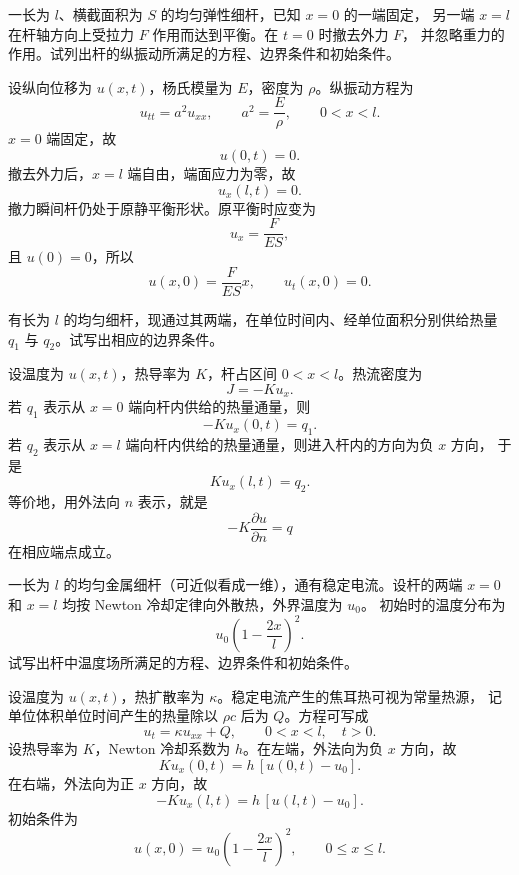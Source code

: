 ﻿


\begin{question}
一长为 \(l\)、横截面积为 \(S\) 的均匀弹性细杆，已知 \(x=0\) 的一端固定，
另一端 \(x=l\) 在杆轴方向上受拉力 \(F\) 作用而达到平衡。在 \(t=0\) 时撤去外力 \(F\)，
并忽略重力的作用。试列出杆的纵振动所满足的方程、边界条件和初始条件。

\begin{solution}
设纵向位移为 \(u(x,t)\)，杨氏模量为 \(E\)，密度为 \(\rho\)。纵振动方程为
\[
u_{tt}=a^2u_{xx},\qquad a^2=\frac{E}{\rho},\qquad 0<x<l.
\]
\(x=0\) 端固定，故
\[
u(0,t)=0.
\]
撤去外力后，\(x=l\) 端自由，端面应力为零，故
\[
u_x(l,t)=0.
\]
撤力瞬间杆仍处于原静平衡形状。原平衡时应变为
\[
u_x=\frac{F}{ES},
\]
且 \(u(0)=0\)，所以
\[
u(x,0)=\frac{F}{ES}x,\qquad u_t(x,0)=0.
\]
\end{solution}
\end{question}

\begin{question}
有长为 \(l\) 的均匀细杆，现通过其两端，在单位时间内、经单位面积分别供给热量
\(q_1\) 与 \(q_2\)。试写出相应的边界条件。
\begin{solution}
设温度为 \(u(x,t)\)，热导率为 \(K\)，杆占区间 \(0<x<l\)。热流密度为
\[
J=-K u_x.
\]
若 \(q_1\) 表示从 \(x=0\) 端向杆内供给的热量通量，则
\[
-K u_x(0,t)=q_1.
\]
若 \(q_2\) 表示从 \(x=l\) 端向杆内供给的热量通量，则进入杆内的方向为负 \(x\) 方向，
于是
\[
K u_x(l,t)=q_2.
\]
等价地，用外法向 \(n\) 表示，就是
\[
-K\frac{\partial u}{\partial n}=q
\]
在相应端点成立。
\end{solution}
\end{question}

\begin{question}
一长为 \(l\) 的均匀金属细杆（可近似看成一维），通有稳定电流。设杆的两端
\(x=0\) 和 \(x=l\) 均按 Newton 冷却定律向外散热，外界温度为 \(u_0\)。
初始时的温度分布为
\[
u_0\left(1-\frac{2x}{l}\right)^2.
\]
试写出杆中温度场所满足的方程、边界条件和初始条件。
\begin{solution}
设温度为 \(u(x,t)\)，热扩散率为 \(\kappa\)。稳定电流产生的焦耳热可视为常量热源，
记单位体积单位时间产生的热量除以 \(\rho c\) 后为 \(Q\)。方程可写成
\[
u_t=\kappa u_{xx}+Q,\qquad 0<x<l,\quad t>0.
\]
设热导率为 \(K\)，Newton 冷却系数为 \(h\)。在左端，外法向为负 \(x\) 方向，故
\[
K u_x(0,t)=h\,[u(0,t)-u_0].
\]
在右端，外法向为正 \(x\) 方向，故
\[
-K u_x(l,t)=h\,[u(l,t)-u_0].
\]
初始条件为
\[
u(x,0)=u_0\left(1-\frac{2x}{l}\right)^2,\qquad 0\le x\le l.
\]
\end{solution}
\end{question}

